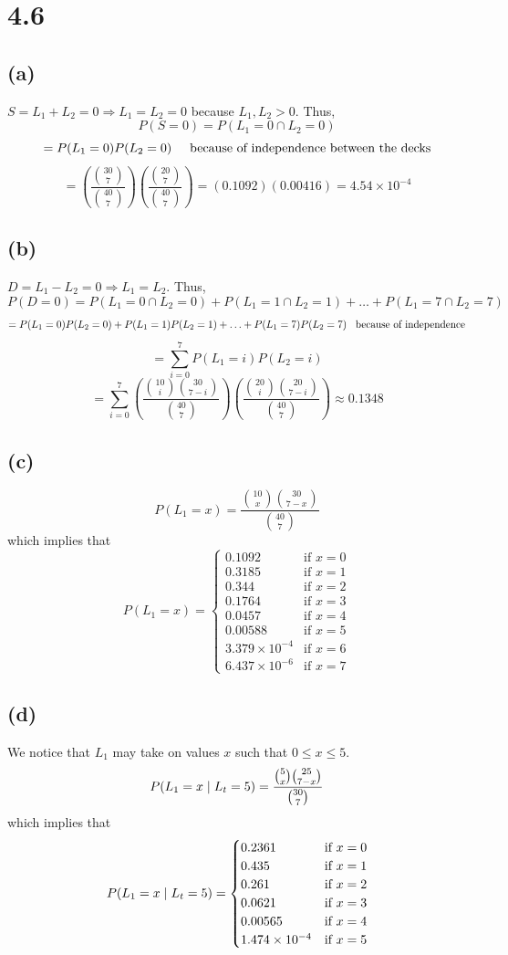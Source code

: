 \documentclass[11pt]{article}
\begin{document}
\section*{4.6}
\subsection*{(a)}
$S=L_1+L_2=0\Rightarrow L_1=L_2=0$ because $L_1,L_2>0$. Thus,
\[P(S=0)=P(L_1=0\cap L_2=0)\]
\[=P(L_1=0)P(L_2=0)\hspace{5mm}\text{because of independence between the decks}\]
\[=\left(\frac{\binom{30}{7}}{\binom{40}{7}}\right)\left(\frac{\binom{20}{7}}{\binom{40}{7}}\right)=(0.1092)(0.00416)=4.54\times 10^{-4}\]
\subsection*{(b)}
$D=L_1-L_2=0\Rightarrow L_1=L_2$. Thus,
\[P(D=0)=P(L_1=0\cap L_2=0)+P(L_1=1\cap L_2=1)+\ldots+P(L_1=7\cap L_2=7)\]
\[=P(L_1=0)P(L_2=0)+P(L_1=1)P(L_2=1)+\ldots+P(L_1=7)P(L_2=7)\hspace{3mm}\text{because of independence}\]
\[=\sum_{i=0}^7P(L_1=i)P(L_2=i)\]
\[=\sum_{i=0}^7\left(\frac{\binom{10}{i}\binom{30}{7-i}}{\binom{40}{7}}\right)\left(\frac{\binom{20}{i}\binom{20}{7-i}}{\binom{40}{7}}\right)\approx 0.1348\]
\subsection*{(c)}
\[P(L_1=x)=\frac{\binom{10}{x}\binom{30}{7-x}}{\binom{40}{7}}\]
which implies that
\[P(L_1=x)=\begin{cases}
	0.1092 & \text{if }x=0 \\
	0.3185 & \text{if }x=1 \\
	0.344 & \text{if }x=2 \\
	0.1764 & \text{if }x=3 \\
	0.0457 & \text{if }x=4 \\
	0.00588 & \text{if }x=5 \\
	3.379\times 10^{-4} & \text{if }x=6 \\
	6.437\times 10^{-6} & \text{if }x=7
\end{cases}\]
\subsection*{(d)}
We notice that $L_1$ may take on values $x$ such that $0\leq x\leq 5$.
\[P(L_1=x\hspace{1mm}|\hspace{1mm}L_t=5)=\frac{\binom{5}{x}\binom{25}{7-x}}{\binom{30}{7}}\]
which implies that
\[P(L_1=x\hspace{1mm}|\hspace{1mm}L_t=5)=\begin{cases}
	0.2361 & \text{if }x=0 \\
	0.435 & \text{if }x=1 \\
	0.261 & \text{if }x=2 \\
	0.0621 & \text{if }x=3 \\
	0.00565 & \text{if }x=4 \\
	1.474\times10^{-4} & \text{if }x=5
\end{cases}\]
\end{document}
